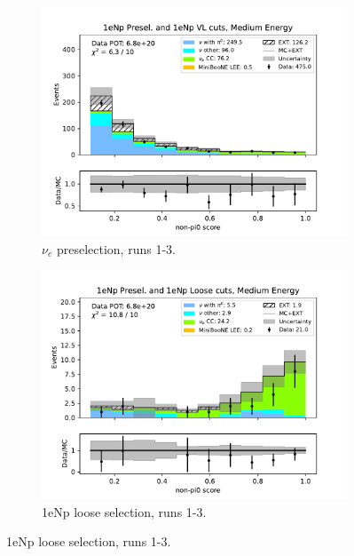 \begin{figure}[H]
    \centering
    \begin{subfigure}{0.33\linewidth}
        \includegraphics[width=\linewidth]{technote/Sidebands/Figures/NearSideband/near_sideband_nonpi0_score_run123_NP_NP_MEDIUM_ENERGY.pdf}
        \caption{$\nu_e$ preselection, runs 1-3.}
    \end{subfigure}%
    \begin{subfigure}{0.33\linewidth}
        \includegraphics[width=\linewidth]{technote/Sidebands/Figures/NearSideband/near_sideband_nonpi0_score_run123_NP_NPL_MEDIUM_ENERGY.pdf}
        \caption{1eNp loose selection, runs 1-3.}
    \end{subfigure}%

\end{figure}
